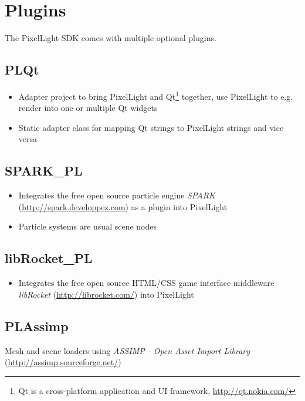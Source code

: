 \chapter{Plugins}
The PixelLight SDK comes with multiple optional plugins.




\section{PLQt}
\begin{itemize}
\item{Adapter project to bring PixelLight and Qt\footnote{Qt is a cross-platform application and UI framework, \url{http://qt.nokia.com/}} together, use PixelLight to e.g. render into one or multiple Qt widgets}
\item{Static adapter class for mapping Qt strings to PixelLight strings and vice versa}
\end{itemize}




\section{SPARK\_PL}
\begin{itemize}
\item{Integrates the free open source particle engine \emph{SPARK} (\url{http://spark.developpez.com}) as a plugin into PixelLight}
\item{Particle systems are usual scene nodes}
\end{itemize}




\section{libRocket\_PL}
\begin{itemize}
\item{Integrates the free open source HTML/CSS game interface middleware \emph{libRocket} (\url{http://librocket.com/}) into PixelLight}
\end{itemize}




\section{PLAssimp}
Mesh and scene loaders using \emph{ASSIMP - Open Asset Import Library} (\url{http://assimp.sourceforge.net/})




